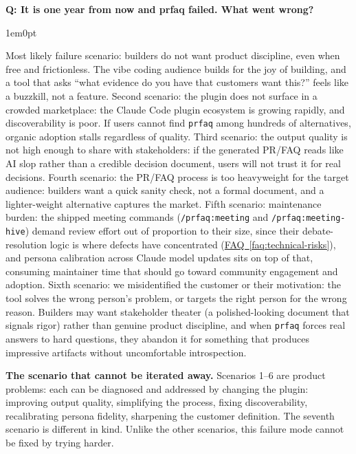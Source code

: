 \documentclass[11pt,letterpaper]{article}
\newcounter{faqnum}
\newenvironment{faqpair}[1]{%
  \needspace{4\baselineskip}%
  \vspace{0.5em}%
  \refstepcounter{faqnum}%
  \noindent\textbf{\color{SectionBlue}Q\thefaqnum: #1}\par\nopagebreak[4]%
  \vspace{0.2em}%
  \begin{adjustwidth}{1em}{0pt}%
  \setlength{\parindent}{0pt}%
}{%
  \end{adjustwidth}%
  \vspace{0.5em}%
}
\newcommand{\faqref}[1]{\hyperref[#1]{FAQ~\ref*{#1}}}
\begin{document}
\begin{faqpair}{It is one year from now and prfaq failed. What went wrong?}
  Most likely failure scenario: builders do not want product discipline, even when free and frictionless. The vibe coding audience builds for the joy of building, and a tool that asks ``what evidence do you have that customers want this?'' feels like a buzzkill, not a feature. Second scenario: the plugin does not surface in a crowded marketplace: the Claude Code plugin ecosystem is growing rapidly, and discoverability is poor. If users cannot find \texttt{prfaq} among hundreds of alternatives, organic adoption stalls regardless of quality. Third scenario: the output quality is not high enough to share with stakeholders: if the generated PR/FAQ reads like AI slop rather than a credible decision document, users will not trust it for real decisions. Fourth scenario: the PR/FAQ process is too heavyweight for the target audience: builders want a quick sanity check, not a formal document, and a lighter-weight alternative captures the market. Fifth scenario: maintenance burden: the shipped meeting commands (\texttt{/prfaq:meeting} and \texttt{/prfaq:meeting-hive}) demand review effort out of proportion to their size, since their debate-resolution logic is where defects have concentrated (\faqref{faq:technical-risks}), and persona calibration across Claude model updates sits on top of that, consuming maintainer time that should go toward community engagement and adoption. Sixth scenario: we misidentified the customer or their motivation: the tool solves the wrong person's problem, or targets the right person for the wrong reason. Builders may want stakeholder theater (a polished-looking document that signals rigor) rather than genuine product discipline, and when \texttt{prfaq} forces real answers to hard questions, they abandon it for something that produces impressive artifacts without uncomfortable introspection.

  \medskip
  \textbf{The scenario that cannot be iterated away.} Scenarios 1--6 are product problems: each can be diagnosed and addressed by changing the plugin: improving output quality, simplifying the process, fixing discoverability, recalibrating persona fidelity, sharpening the customer definition. The seventh scenario is different in kind. Unlike the other scenarios, this failure mode cannot be fixed by trying harder.


\end{faqpair}
\end{document}
